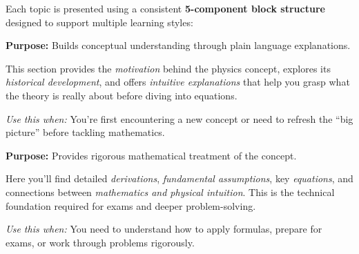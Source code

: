 Each topic is presented using a consistent
\textbf{5-component block structure} designed to support multiple learning styles:

\bigskip

\noindent
\begin{minipage}{0.9\textwidth}
  \begin{tcolorbox}[breakable, colback=GoldBG, colframe=StarGold,
                     leftrule=4pt, arc=0pt,
                     before upper={\textcolor{StarGold}{\textbf{\scshape Physics Intuition}}\par\smallskip}]
    \textbf{Purpose:} Builds conceptual understanding through plain language explanations.

    This section provides the \emph{motivation} behind the physics concept,
    explores its \emph{historical development}, and offers \emph{intuitive explanations}
    that help you grasp what the theory is really about before diving into equations.

    \smallskip
    \textit{Use this when:} You're first encountering a new concept or need to refresh
    the ``big picture'' before tackling mathematics.
  \end{tcolorbox}
\end{minipage}

\bigskip

\noindent
\begin{minipage}{0.9\textwidth}
  \begin{tcolorbox}[colback=TealBG, colframe=NebulaTeal,
                     leftrule=4pt, arc=0pt,
                     before upper={\textcolor{NebulaTeal}{\textbf{\scshape Theory}}\par\smallskip}]
    \textbf{Purpose:} Provides rigorous mathematical treatment of the concept.

    Here you'll find detailed \emph{derivations}, \emph{fundamental assumptions},
    key \emph{equations}, and connections between \emph{mathematics and physical intuition}.
    This is the technical foundation required for exams and deeper problem-solving.

    \smallskip
    \textit{Use this when:} You need to understand how to apply formulas, prepare for exams,
    or work through problems rigorously.
  \end{tcolorbox}
\end{minipage}

\bigskip

